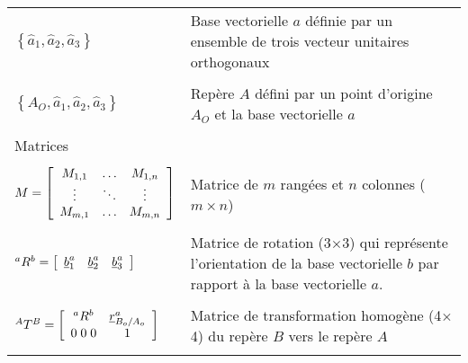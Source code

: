 \begin{center}
\begin{tabular}{p{5cm}  p{9cm}}
$\left\{ \hat{a}_1 , \hat{a}_2 , \hat{a}_3 \right\}$  & Base vectorielle $a$ définie par un ensemble de trois vecteur unitaires orthogonaux \\   &  \\ 
$\left\{ A_O , \hat{a}_1 , \hat{a}_2 , \hat{a}_3 \right\}$  & Repère $A$ défini par un point d'origine $A_O$ et la base vectorielle $a$ \\   &  \\
\multicolumn{2}{l}{Matrices} \\ \hline \\
$M=\left[ \begin{array}{c c c}
	M_{1,1} & \hdots & M_{1,n}  \\ \vdots & \ddots & \vdots \\ M_{m,1}  & \hdots & M_{m,n}
\end{array}  \right] $   
& Matrice de $m$ rangées et $n$ colonnes ($m \times n$) \\   &  \\
${}^aR^b = \left[ \begin{array}{c c c}
	\underline{b}_1^a  & \underline{b}_2^a & \underline{b}_3^a
\end{array}  \right]$            & Matrice de rotation (3$\times$3) qui représente l'orientation de la base vectorielle $b$ par rapport à la base vectorielle $a$. %
 \\   &  \\
$^{A}T^B = \left[ \begin{array}{c c}
	{}^aR^b  & \underline{r}^a_{B_o/A_o} \\ 0 \; 0 \; 0 & 1
\end{array}  \right] $           & Matrice de transformation homogène (4$\times$4) du repère $B$ vers le repère $A$\\   &  \\

\end{tabular}
\end{center}
